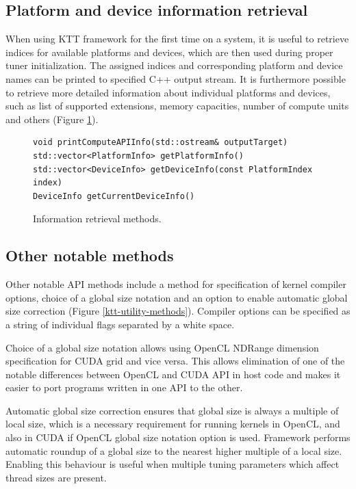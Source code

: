 \documentclass
[
    digital, %
    oneside, %
    table, %
    nolof, %
    nolot, %
    nocover %
]{fithesis3}
\begin{document}
\subsection{Platform and device information retrieval}
When using KTT framework for the first time on a system, it is useful to retrieve indices for available platforms and devices, which are then used during
proper tuner initialization. The assigned indices and corresponding platform and device names can be printed to specified C++ output stream. It is
furthermore possible to retrieve more detailed information about individual platforms and devices, such as list of supported extensions, memory
capacities, number of compute units and others (Figure \ref{ktt-information-methods}).

\begin{figure}
\begin{adjustwidth}{-1cm}{-1cm}
\begin{lstlisting}
void printComputeAPIInfo(std::ostream& outputTarget)
std::vector<PlatformInfo> getPlatformInfo()
std::vector<DeviceInfo> getDeviceInfo(const PlatformIndex index)
DeviceInfo getCurrentDeviceInfo()
\end{lstlisting}
\caption{Information retrieval methods.}
\label{ktt-information-methods}
\end{adjustwidth}
\end{figure}

\subsection{Other notable methods}
Other notable API methods include a method for specification of kernel compiler options, choice of a global size notation and an option to enable
automatic global size correction (Figure \ref{ktt-utility-methods}). Compiler options can be specified as a string of individual flags separated by
a white space.

Choice of a global size notation allows using OpenCL NDRange dimension specification for CUDA grid and vice versa. This allows elimination of one of
the notable differences between OpenCL and CUDA API in host code and makes it easier to port programs written in one API to the other.

Automatic global size correction ensures that global size is always a multiple of local size, which is a necessary requirement for running kernels
in OpenCL, and also in CUDA if OpenCL global size notation option is used. Framework performs automatic roundup of a global size to the nearest higher
multiple of a local size. Enabling this behaviour is useful when multiple tuning parameters which affect thread sizes are present.
\end{document}
